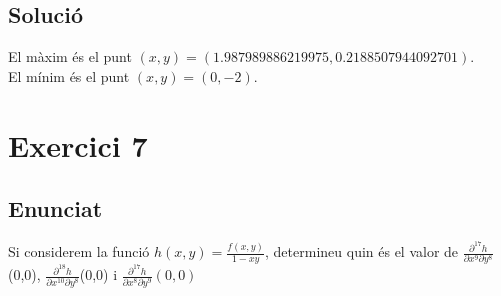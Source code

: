 \documentclass[12pt]{report}
\begin{document}
\section{Solució}
El màxim és el punt $(x,y)=(1.987989886219975,0.2188507944092701)$.\\
El mínim és el punt $(x,y)=(0,-2)$.

\chapter{Exercici 7}
\section{Enunciat}
Si considerem la funció $h(x,y) = \frac{f(x,y)}{1-xy}$, determineu quin és el valor de $\frac{\partial ^{17} h }{\partial x^9 \partial y^8}$(0,0), $\frac{\partial ^{18} h }{\partial x^{10} \partial y^8}$(0,0) i $\frac{\partial ^{17} h }{\partial x^8 \partial y^9}(0,0)$
\end{document}
